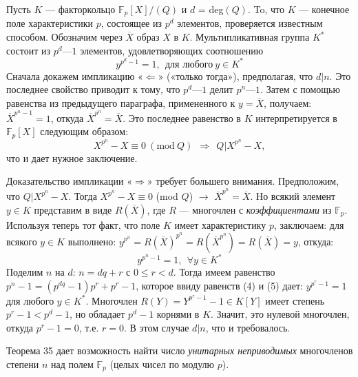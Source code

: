 \documentclass{mai_book}
\begin{document}
\begin{myproof}
Пусть $K$ — факторкольцо $\mathbb{F}_p[X]\slash(Q)$ и $d$ = deg$(Q)$. To, что $K$ — 
конечное поле характеристики $p$, состоящее из $p^d$ элементов,  
проверяется известным способом. Обозначим через $\overline{X}$ образ $X$ в $K$. 
Мультипликативная группа $K^*$ состоит из $p^d — 1$ элементов,  
удовлетворяющих соотношению 
\begin{equation}
y^{p^d - 1} = 1,\:\: \text{для любого}\: y\in K^*
\end{equation}
Сначала докажем импликацию «$\Leftarrow$» («только тогда»), предполагая, 
что $d | n$. Это последнее свойство приводит к тому, что $p^d — 1$ делит 
$p^n — 1$. Затем с помощью равенства из предыдущего параграфа,  
примененного к $y = \overline{X}$, получаем: $\overline{X}^{p^n -1} = 1$, откуда $\overline{X}^{p^n} = \overline{X}$. 
Это последнее равенство в $K$ интерпретируется в $\mathbb{F}_p [X]$ следующим 
образом: 
\begin{equation*}
X^{p^n} - X \equiv 0\: (\text{mod}\: Q)\:\: \Rightarrow\:\: Q|X^{p^n} - X,
\end{equation*}
что и дает нужное заключение.

\noindent Доказательство импликации «$\Rightarrow$» требует большего внимания. 
Предположим, что $Q | X^{p^n} - X$. Тогда $X^{p^n} - X \equiv 0$ (mod $Q$) $\rightarrow$ 
$\overline{X}^{p^n} = \overline{X}$. Но всякий элемент $y\in K$ представим в виде $R(\overline{X})$, где $R$ 
— многочлен с \textit{коэффициентами} из $\mathbb{F}_p$. Используя теперь тот факт, 
что поле $K$ имеет характеристику $p$, заключаем: для всякого $y \in K$ 
выполнено: $y^{p^n} = R(\overline{X})^{p^n} = R(\overline{X}^{p^n}) = R(\overline{X}) = y$, откуда: 
\begin{equation}
y^{p^n - 1} = 1,\:\: \forall y \in K^*
\end{equation}
Поделим $n$ на $d$: $n = dq + r$ с $0\leqslant r < d$. Тогда имеем равенство
$p^n - 1 = (p^{dq} - 1)p^r + p^r - 1$, которое ввиду равенств (4) и (5) дает:
$y^{p^r - 1} = 1$ для любого $y \in K^*$. Многочлен $R(Y) = Y^{p^r -1} - 1 \in K[Y]$
имеет степень $p^r - 1 < p^d - 1$, но обладает $p^d - 1$ корнями в $K$.
Значит, это нулевой многочлен, откуда $p^r - 1 = 0$, т.е. $r = 0$. В этом
случае $d | n$, что и требовалось.
\end{myproof}

Теорема 35 дает возможность найти число \textit{унитарных неприводимых}
многочленов степени $n$ над полем $\mathbb{F}_p$ (целых чисел по модулю $p$).
 
\end{document}
